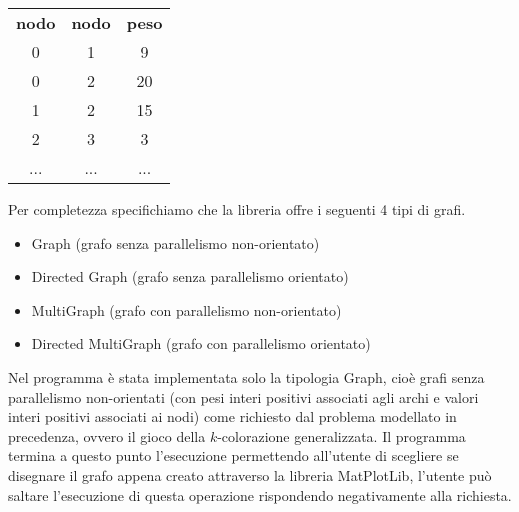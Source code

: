 \begin{table}[H]
\centering
\begin{tabular}{ccc}
\textbf{nodo} & \textbf{nodo} & \textbf{peso} \\
0 & 1 & 9 \\
0 & 2 & 20 \\
1 & 2 & 15 \\
2 & 3 & 3 \\
... & ... & ...
\end{tabular}
\end{table}

Per completezza specifichiamo che la libreria offre i seguenti 4 tipi di grafi.

\begin{itemize}
	\item Graph (grafo senza parallelismo non-orientato)
	\item Directed Graph (grafo senza parallelismo orientato)
	\item MultiGraph (grafo con parallelismo non-orientato)
	\item Directed MultiGraph (grafo con parallelismo orientato)
\end{itemize}

Nel programma è stata implementata solo la tipologia Graph, cioè grafi senza parallelismo non-orientati (con pesi interi positivi associati agli archi e valori interi positivi associati ai nodi) come richiesto dal problema modellato in precedenza, ovvero il gioco della \(k\)-colorazione generalizzata. Il programma termina a questo punto l'esecuzione permettendo all'utente di scegliere se disegnare il grafo appena creato attraverso la libreria MatPlotLib, l'utente può saltare l'esecuzione di questa operazione rispondendo negativamente alla richiesta.\\

